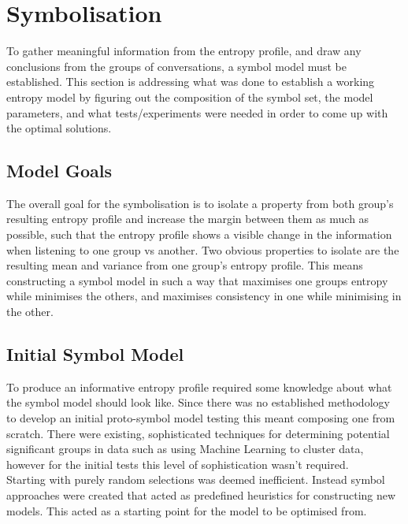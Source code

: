 \newpage
\section{Symbolisation}
To gather meaningful information from the entropy profile, and draw any conclusions from the groups of conversations, a symbol model must be established. This section is addressing what was done to establish a working entropy model by figuring out the composition of the symbol set, the model parameters, and what tests/experiments were needed in order to come up with the optimal solutions.

\subsection{Model Goals}
The overall goal for the symbolisation is to isolate a property from both group's resulting entropy profile and increase the margin between them as much as possible, such that the entropy profile shows a visible change in the information when listening to one group vs another. Two obvious properties to isolate are the resulting mean and variance from one group's entropy profile. 
This means constructing a symbol model in such a way that maximises one groups entropy while minimises the others, and maximises consistency in one while minimising in the other. \\

\subsection{Initial Symbol Model}
To produce an informative entropy profile required some knowledge about what the symbol model should look like. Since there was no established methodology to develop an initial proto-symbol model testing this meant composing one from scratch. There were existing, sophisticated techniques for determining potential significant groups in data such as using Machine Learning to cluster data, however for the initial tests this level of sophistication wasn't required. \\

Starting with purely random selections was deemed inefficient. Instead symbol approaches were created that acted as predefined heuristics for constructing new models. This acted as a starting point for the model to be optimised from.  

